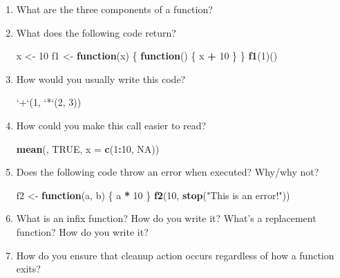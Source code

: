 \documentclass[]{book}
\newenvironment{Shaded}{\begin{snugshade}}{\end{snugshade}}
\newcommand{\ControlFlowTok}[1]{\textcolor[rgb]{0.13,0.29,0.53}{\textbf{#1}}}
\newcommand{\DataTypeTok}[1]{\textcolor[rgb]{0.13,0.29,0.53}{#1}}
\newcommand{\DecValTok}[1]{\textcolor[rgb]{0.00,0.00,0.81}{#1}}
\newcommand{\KeywordTok}[1]{\textcolor[rgb]{0.13,0.29,0.53}{\textbf{#1}}}
\newcommand{\NormalTok}[1]{#1}
\newcommand{\OperatorTok}[1]{\textcolor[rgb]{0.81,0.36,0.00}{\textbf{#1}}}
\newcommand{\OtherTok}[1]{\textcolor[rgb]{0.56,0.35,0.01}{#1}}
\newcommand{\StringTok}[1]{\textcolor[rgb]{0.31,0.60,0.02}{#1}}
\theoremstyle{definition}
\theoremstyle{definition}
\theoremstyle{definition}
\theoremstyle{remark}
\begin{document}
\begin{enumerate}
\def\labelenumi{\arabic{enumi}.}
\item
  What are the three components of a function?
\item
  What does the following code return?

\begin{Shaded}
\begin{Highlighting}[]
\NormalTok{x <-}\StringTok{ }\DecValTok{10}
\NormalTok{f1 <-}\StringTok{ }\ControlFlowTok{function}\NormalTok{(x) \{}
  \ControlFlowTok{function}\NormalTok{() \{}
\NormalTok{    x }\OperatorTok{+}\StringTok{ }\DecValTok{10}
\NormalTok{  \}}
\NormalTok{\}}
\KeywordTok{f1}\NormalTok{(}\DecValTok{1}\NormalTok{)()}
\end{Highlighting}
\end{Shaded}
\item
  How would you usually write this code?

\begin{Shaded}
\begin{Highlighting}[]
\StringTok{`}\DataTypeTok{+}\StringTok{`}\NormalTok{(}\DecValTok{1}\NormalTok{, }\StringTok{`}\DataTypeTok{*}\StringTok{`}\NormalTok{(}\DecValTok{2}\NormalTok{, }\DecValTok{3}\NormalTok{))}
\end{Highlighting}
\end{Shaded}
\item
  How could you make this call easier to read?

\begin{Shaded}
\begin{Highlighting}[]
\KeywordTok{mean}\NormalTok{(, }\OtherTok{TRUE}\NormalTok{, }\DataTypeTok{x =} \KeywordTok{c}\NormalTok{(}\DecValTok{1}\OperatorTok{:}\DecValTok{10}\NormalTok{, }\OtherTok{NA}\NormalTok{))}
\end{Highlighting}
\end{Shaded}
\item
  Does the following code throw an error when executed? Why/why not?

\begin{Shaded}
\begin{Highlighting}[]
\NormalTok{f2 <-}\StringTok{ }\ControlFlowTok{function}\NormalTok{(a, b) \{}
\NormalTok{  a }\OperatorTok{*}\StringTok{ }\DecValTok{10}
\NormalTok{\}}
\KeywordTok{f2}\NormalTok{(}\DecValTok{10}\NormalTok{, }\KeywordTok{stop}\NormalTok{(}\StringTok{"This is an error!"}\NormalTok{))}
\end{Highlighting}
\end{Shaded}
\item
  What is an infix function? How do you write it? What's a replacement
  function? How do you write it?
\item
  How do you ensure that cleanup action occurs regardless of how a
  function exits?
\end{enumerate}
\end{document}
